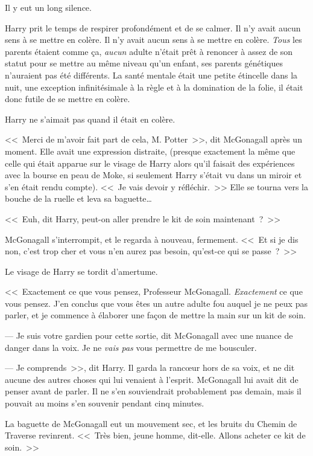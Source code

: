 Il y eut un long silence.

Harry prit le temps de respirer profondément et de se calmer. Il n'y avait aucun sens à se mettre en colère. Il n'y avait aucun sens à se mettre en colère. \emph{Tous} les parents étaient comme ça, \emph{aucun} adulte n'était prêt à renoncer à assez de son statut pour se mettre au même niveau qu'un enfant, ses parents génétiques n'auraient pas été différents. La santé mentale était une petite étincelle dans la nuit, une exception infinitésimale à la règle et à la domination de la folie, il était donc futile de se mettre en colère.

Harry ne s'aimait pas quand il était en colère.

<<~Merci de m'avoir fait part de cela, M. Potter~>>, dit McGonagall après un moment. Elle avait une expression distraite, (presque exactement la même que celle qui était apparue sur le visage de Harry alors qu'il faisait des expériences avec la bourse en peau de Moke, si seulement Harry s'était vu dans un miroir et s'en était rendu compte). <<~Je vais devoir y réfléchir.~>> Elle se tourna vers la bouche de la ruelle et leva sa baguette…

<<~Euh, dit Harry, peut-on aller prendre le kit de soin maintenant~?~>>

McGonagall s'interrompit, et le regarda à nouveau, fermement. <<~Et si je dis non, c'est trop cher et vous n'en aurez pas besoin, qu'est-ce qui se passe~?~>>

Le visage de Harry se tordit d'amertume. 

<<~Exactement ce que vous pensez, Professeur McGonagall. \emph{Exactement} ce que vous pensez. J'en conclus que vous êtes un autre adulte fou auquel je ne peux pas parler, et je commence à élaborer une façon de mettre la main sur un kit de soin.

--- Je suis votre gardien pour cette sortie, dit McGonagall avec une nuance de danger dans la voix. Je ne \emph{vais pas} vous permettre de me bousculer.

--- Je comprends~>>, dit Harry. Il garda la rancœur hors de sa voix, et ne dit aucune des autres choses qui lui venaient à l'esprit. McGonagall lui avait dit de penser avant de parler. Il ne s'en souviendrait probablement pas demain, mais il pouvait au moins s'en souvenir pendant cinq minutes.

La baguette de McGonagall eut un mouvement sec, et les bruits du Chemin de Traverse revinrent. <<~Très bien, jeune homme, dit-elle. Allons acheter ce kit de soin.~>>

